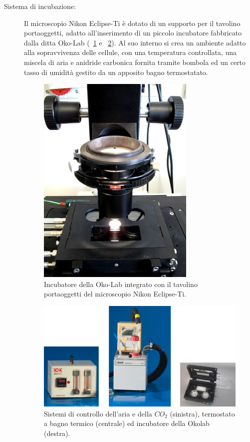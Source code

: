 \begin{description}
\item[Sistema di incubazione:]
Il microscopio Nikon Eclipse-Ti è dotato di un supporto per il tavolino portaoggetti, adatto all'inserimento di un piccolo incubatore fabbricato dalla ditta Oko-Lab (\figurename~\ref{fig:okolab} e \figurename~\ref{fig:controllo}).
Al suo interno si crea un ambiente adatto alla sopravvivenza delle cellule, con una temperatura controllata, una miscela di aria e anidride carbonica fornita tramite bombola ed un certo tasso di umidità gestito da un apposito bagno termostatato.

\begin{figure}
 \centering
 \includegraphics[scale=.60]{img/CAP2okolab.png}
 \caption{\small{Incubatore della Oko-Lab integrato con il tavolino portaoggetti del microscopio Nikon Eclipse-Ti.}}
 \label{fig:okolab}
\end{figure}

\begin{figure}
 \centering
 \includegraphics[scale=.45]{img/CAP2controllo.png}
 \caption{\small{Sistemi di controllo dell'aria e della $CO_2$ (sinistra), termostato a bagno termico (centrale) ed incubatore della Okolab (destra).}}
 \label{fig:controllo}
\end{figure}


\end{description}
